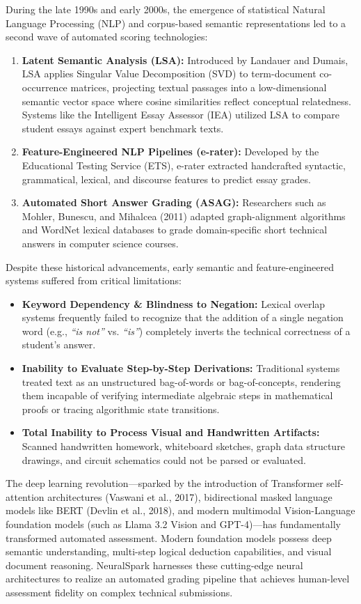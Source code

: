 During the late 1990s and early 2000s, the emergence of statistical Natural Language Processing (NLP) and corpus-based semantic representations led to a second wave of automated scoring technologies:
\begin{enumerate}[leftmargin=*]
    \item \textbf{Latent Semantic Analysis (LSA):} Introduced by Landauer and Dumais, LSA applies Singular Value Decomposition (SVD) to term-document co-occurrence matrices, projecting textual passages into a low-dimensional semantic vector space where cosine similarities reflect conceptual relatedness. Systems like the Intelligent Essay Assessor (IEA) utilized LSA to compare student essays against expert benchmark texts.
    \item \textbf{Feature-Engineered NLP Pipelines (e-rater):} Developed by the Educational Testing Service (ETS), e-rater extracted handcrafted syntactic, grammatical, lexical, and discourse features to predict essay grades.
    \item \textbf{Automated Short Answer Grading (ASAG):} Researchers such as Mohler, Bunescu, and Mihalcea (2011) adapted graph-alignment algorithms and WordNet lexical databases to grade domain-specific short technical answers in computer science courses.
\end{enumerate}

Despite these historical advancements, early semantic and feature-engineered systems suffered from critical limitations:
\begin{itemize}[leftmargin=*]
    \item \textbf{Keyword Dependency \& Blindness to Negation:} Lexical overlap systems frequently failed to recognize that the addition of a single negation word (e.g., \textit{``is not''} vs. \textit{``is''}) completely inverts the technical correctness of a student's answer.
    \item \textbf{Inability to Evaluate Step-by-Step Derivations:} Traditional systems treated text as an unstructured bag-of-words or bag-of-concepts, rendering them incapable of verifying intermediate algebraic steps in mathematical proofs or tracing algorithmic state transitions.
    \item \textbf{Total Inability to Process Visual and Handwritten Artifacts:} Scanned handwritten homework, whiteboard sketches, graph data structure drawings, and circuit schematics could not be parsed or evaluated.
\end{itemize}

The deep learning revolution—sparked by the introduction of Transformer self-attention architectures (Vaswani et al., 2017), bidirectional masked language models like BERT (Devlin et al., 2018), and modern multimodal Vision-Language foundation models (such as Llama 3.2 Vision and GPT-4)—has fundamentally transformed automated assessment. Modern foundation models possess deep semantic understanding, multi-step logical deduction capabilities, and visual document reasoning. NeuralSpark harnesses these cutting-edge neural architectures to realize an automated grading pipeline that achieves human-level assessment fidelity on complex technical submissions.

